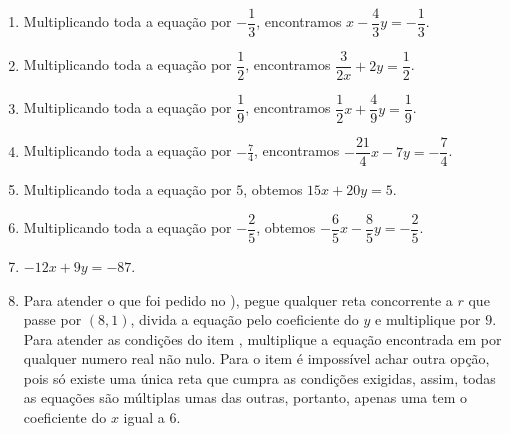 \documentclass[10 pt,usenames,dvipsnames, oneside]{article}
\begin{document}
\ifdefined\prof
\clearpage
\begin{solucao}

\begin{enumerate}
\item Multiplicando toda a equação por $-\dfrac{1}{3}$, encontramos $x-\dfrac{4}{3}y = -\dfrac{1}{3}$.
\item Multiplicando toda a equação por $\dfrac{1}{2}$, encontramos $\dfrac{3}{2x} + 2y =\dfrac{1}{2}$.
\item Multiplicando toda a equação por $\dfrac{1}{9}$, encontramos $\dfrac{1}{2}x + \dfrac{4}{9}y = \dfrac{1}{9}$.
\item Multiplicando toda a equação por $-\frac{7}{4}$, encontramos $-\dfrac{21}{4}x - 7y = - \dfrac{7}{4}$.
\item Multiplicando toda a equação por $5$, obtemos $15x + 20y = 5$.
\item Multiplicando toda a equação por $-\dfrac{2}{5}$, obtemos $-\dfrac{6}{5}x - \dfrac{8}{5}y = -\dfrac{2}{5}$.
\item $-12x+9y=-87$.
\item Para atender o que foi pedido no ), pegue qualquer reta concorrente a $r$ que passe por $(8,1)$, divida a equação pelo coeficiente do $y$ e multiplique por $9$. Para atender as condições do item , multiplique a equação encontrada em  por qualquer numero real não nulo. Para o item  é impossível achar outra opção, pois só existe uma única reta que cumpra as condições exigidas, assim, todas as equações são múltiplas umas das outras, portanto, apenas uma tem o coeficiente do $x$ igual a $6$.
\end{enumerate}

\end{solucao}
\fi
\end{document}
